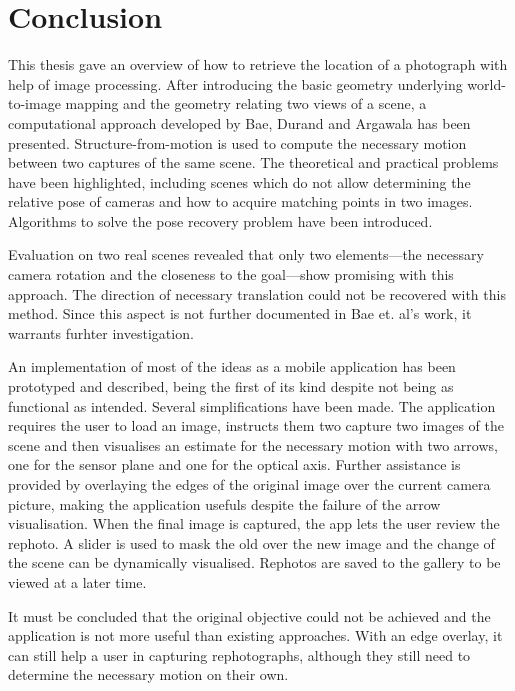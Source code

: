 \chapter{Conclusion}

This thesis gave an overview of how to retrieve the location of a photograph
with help of image processing. After introducing the basic geometry underlying
world-to-image mapping and the geometry relating two views of a scene, a
computational approach developed by Bae, Durand and Argawala has been presented.
Structure-from-motion is used to compute the necessary motion between two
captures of the same scene.  The theoretical and practical problems have been
highlighted, including scenes which do not allow determining the relative pose
of cameras and how to acquire matching points in two images. Algorithms to solve
the pose recovery problem have been introduced.

Evaluation on two real scenes revealed that only two elements---the necessary
camera rotation and the closeness to the goal---show promising with this
approach. The direction of necessary translation could not be recovered with
this method.  Since this aspect is not further documented in Bae et. al's work,
it warrants furhter investigation.

An implementation of most of the ideas as a mobile application has been prototyped and
described, being the first of its kind despite not being as functional as
intended. Several simplifications have been made. The application requires the
user to load an image, instructs them two capture two images of the scene and
then visualises an estimate for the necessary motion with two arrows, one for the
sensor plane and one for the optical axis. Further assistance is provided by
overlaying the edges of the original image over the current camera picture,
making the application usefuls despite the failure of the arrow visualisation.
When the final image is captured, the app lets the user review the rephoto. A
slider is used to mask the old over the new image and the change of the scene
can be dynamically visualised. Rephotos are saved to the gallery to be viewed at
a later time.

It must be concluded that the original objective could not be achieved and
the application is not more useful than existing approaches. With an edge
overlay, it can still help a user in capturing rephotographs, although they
still need to determine the necessary motion on their own.
